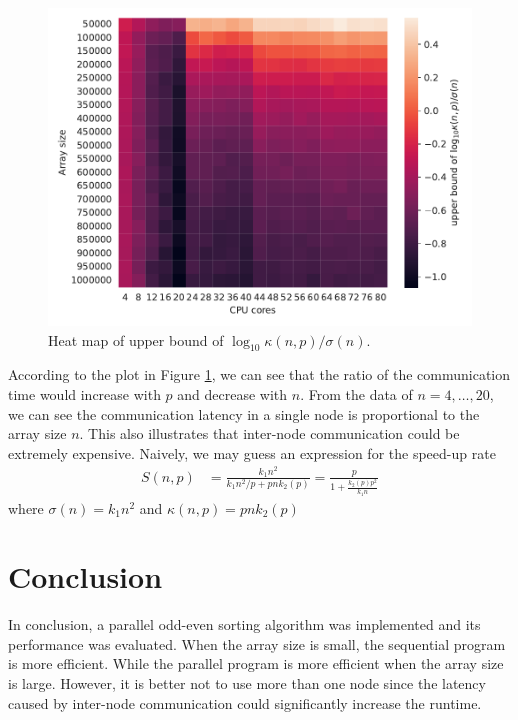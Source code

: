 \documentclass[twoside,12pt]{article}
\theoremstyle{definition}
\theoremstyle{remark}
\begin{document}
\begin{figure}[t!]
    \centering
    \includegraphics[width=\textwidth]{../analysis/ks_heatmap.pdf}
    \caption{Heat map of upper bound of $\log_{10}\kappa(n,p)/\sigma(n)$.}
    \label{fig:logks}
\end{figure}

According to the plot in Figure \ref{fig:logks}, we can see that the ratio
of the communication time would increase with $p$ and decrease with $n$.
From the data of $n=4,\dots,20$, we can see the communication latency
in a single node is proportional to the array size $n$.
This also illustrates that inter-node communication could be extremely
expensive.
Naively, we may guess an expression for the speed-up rate
\begin{align}
    S(n, p) &=
    \frac{k_1 n^2}{k_1n^2/p + pnk_2(p)} = 
    \frac{p}{1 + \frac{k_2(p)p^2}{k_1n}}
\end{align}
where $\sigma(n) = k_1 n^2$ and $\kappa(n, p) = pnk_2(p)$ 


\section{Conclusion}
In conclusion, a parallel odd-even sorting algorithm was implemented and
its performance was evaluated.
When the array size is small, the sequential program is more efficient.
While the parallel program is more efficient when the array size
is large.
However, it is better not to use more than one node since the latency
caused by inter-node communication could significantly increase the
runtime.
\end{document}
